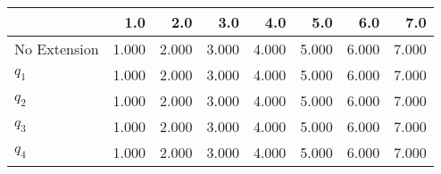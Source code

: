 \begin{tabular}{lrrrrrrr}
\toprule
{} &   1.0 &   2.0 &   3.0 &   4.0 &   5.0 &   6.0 &   7.0 \\
\midrule
No Extension & 1.000 & 2.000 & 3.000 & 4.000 & 5.000 & 6.000 & 7.000 \\
$q_1$        & 1.000 & 2.000 & 3.000 & 4.000 & 5.000 & 6.000 & 7.000 \\
$q_2$        & 1.000 & 2.000 & 3.000 & 4.000 & 5.000 & 6.000 & 7.000 \\
$q_3$        & 1.000 & 2.000 & 3.000 & 4.000 & 5.000 & 6.000 & 7.000 \\
$q_4$        & 1.000 & 2.000 & 3.000 & 4.000 & 5.000 & 6.000 & 7.000 \\
\bottomrule
\end{tabular}
